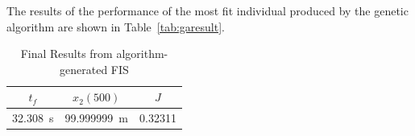 \documentclass[submit]{aiaa-tc}%
\begin{document}
The results of the performance of the most fit individual produced by the genetic algorithm are shown in Table~\vref{tab:garesult}.

\begin{table}
\centering
\caption{Final Results from algorithm-generated FIS}\label{tab:garesult}
	\begin{tabular}{|c|c|c|}
	\hline
	$t_f$ & $x_2(500)$ & $J$ \\\hline
	\SI{32.308}{\second} & \SI{99.999999}{\metre} &  0.32311 \\\hline
	\end{tabular}
\end{table}

\begin{figure}
	\begin{subfigmatrix}{2}
	\end{subfigmatrix}
\end{figure}
\end{document}
